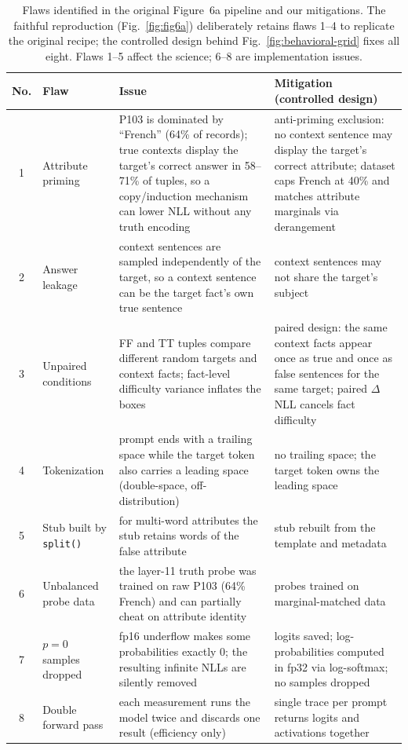\begin{table}[t]
  \centering
  \footnotesize
  \begin{tabular}{clp{5.6cm}p{5.6cm}}
    \toprule
    No. & Flaw & Issue & Mitigation (controlled design) \\
    \midrule
    1 & Attribute priming &
      P103 is dominated by ``French'' (64\% of records); true contexts
      display the target's correct answer in 58--71\% of tuples, so a
      copy/induction mechanism can lower NLL without any truth encoding &
      anti-priming exclusion: no context sentence may display the
      target's correct attribute; dataset caps French at 40\% and
      matches attribute marginals via derangement \\
    2 & Answer leakage &
      context sentences are sampled independently of the target, so a
      context sentence can be the target fact's own true sentence &
      context sentences may not share the target's subject \\
    3 & Unpaired conditions &
      FF and TT tuples compare different random targets and context
      facts; fact-level difficulty variance inflates the boxes &
      paired design: the same context facts appear once as true and
      once as false sentences for the same target; paired
      $\Delta$NLL cancels fact difficulty \\
    4 & Tokenization &
      prompt ends with a trailing space while the target token also
      carries a leading space (double-space, off-distribution) &
      no trailing space; the target token owns the leading space \\
    5 & Stub built by \texttt{split()} &
      for multi-word attributes the stub retains words of the false
      attribute &
      stub rebuilt from the template and metadata \\
    6 & Unbalanced probe data &
      the layer-11 truth probe was trained on raw P103 (64\% French)
      and can partially cheat on attribute identity &
      probes trained on marginal-matched data \\
    7 & $p=0$ samples dropped &
      fp16 underflow makes some probabilities exactly 0; the resulting
      infinite NLLs are silently removed &
      logits saved; log-probabilities computed in fp32 via
      log-softmax; no samples dropped \\
    8 & Double forward pass &
      each measurement runs the model twice and discards one result
      (efficiency only) &
      single trace per prompt returns logits and activations together \\
    \bottomrule
  \end{tabular}
  \caption{Flaws identified in the original Figure~6a pipeline and our
  mitigations. The faithful reproduction (Fig.~\ref{fig:fig6a})
  deliberately retains flaws 1--4 to replicate the original recipe; the
  controlled design behind Fig.~\ref{fig:behavioral-grid} fixes all
  eight. Flaws 1--5 affect the science; 6--8 are implementation issues.}
  \label{tab:flaws}
\end{table}


